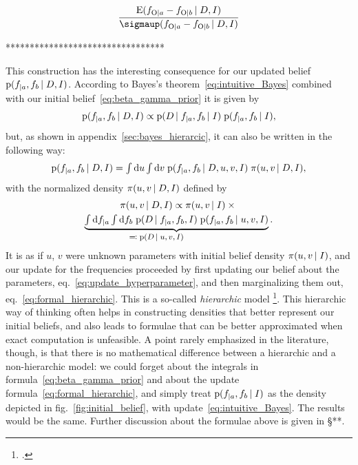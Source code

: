 \documentclass[\ifafour a4paper,12pt,\else a5paper,10pt,\fi%
onecolumn,oneside,article,%
british%
]{memoir}
\theoremstyle{remark}
\theoremstyle{innote}
\newcommand*{\citep}{\footcites}
\newcommand*{\di}{\mathrm{d}}%
\newcommand*{\defs}{\eqqcolon}
\newcommand*{\pf}{\mathrm{p}}%
\newcommand*{\E}{\mathrm{E}}
\renewcommand*{\|}[1][]{\nonscript\,#1\vert\nonscript\;\mathopen{}}
\newcommand*{\sect}{\S}%
\newcommand*{\eqn}{eq.}%
\newcommand*{\fig}{fig.}%
\newcommand*{\zerob}[1]{\makebox[0pt][l]{#1}}
\newcommand*{\tint}{\begingroup\textstyle\int\endgroup\nolimits}
\newcommand*{\std}{\sigmaup}
\newcommand*{\yD}{D}
\newcommand*{\yI}{I}
\newcommand*{\ya}{a}
\newcommand*{\yb}{b}
\newcommand*{\ysA}{\textrm{O}}%
\newcommand*{\dbeta}{\betaup}
\newcommand*{\dA}{\pi}
\newcommand*{\yua}{u}
\newcommand*{\yub}{v}
\begin{document}
\[
  \frac{  \E(f_{\ysA\|\ya} - f_{\ysA\|\yb} \| \yD, \yI)}{
    \std(f_{\ysA\|\ya} - f_{\ysA\|\yb} \| \yD, \yI)}
\]

*********************************

This construction has the interesting consequence for our updated belief
$\pf(f_{|\ya}, f_{\yb} \| \yD, \yI)$. According to Bayes's
theorem~\eqref{eq:intuitive_Bayes} combined with our initial
belief~\eqref{eq:beta_gamma_prior} it is given by
\begin{equation}
  \label{eq:straight_Bayes}
  \pf(f_{|\ya}, f_{\yb} \| \yD, \yI)
  \propto
  \pf(\yD \| f_{|\ya}, f_{\yb} \| \yI)\;
  \pf(f_{|\ya}, f_{\yb} \| \yI),
\end{equation}
but, as shown in appendix~\ref{sec:bayes_hierarcic}, it can also be written
in the following way:
\begin{equation}
  \label{eq:formal_hierarchic}
  \pf(f_{|\ya}, f_{\yb} \| \yD, \yI) =
  \tint\di\yua\tint\di\yub\;
  \pf(f_{|\ya}, f_{\yb}\| \yD,\yua,\yub,\yI)\;
  \dA(\yua,\yub \|\yD, \yI),
\end{equation}
with the normalized density $\dA(\yua,\yub \|\yD, \yI)$ defined by
\begin{multline}
  \label{eq:update_hyperparameter}
  \dA(\yua,\yub \|\yD, \yI) \propto   \dA(\yua,\yub \|\yI)
\times{}\\
\underbrace{\tint\di f_{|\ya}\tint\di f_{\yb}\;
  \pf(\yD \|f_{|\ya}, f_{\yb}, \yI)\;
 \pf(f_{|\ya}, f_{\yb} \|\yua,\yub, \yI)}_{\zerob{\footnotesize${}\defs\pf(\yD \|\yua,\yub,\yI)$}}.
\end{multline}
It is as if $\yua$, $\yub$ were unknown parameters with initial belief
density $\dA(\yua,\yub \|\yI)$, and our update for the frequencies proceeded by
first updating our belief about the parameters,
\eqn~\eqref{eq:update_hyperparameter}, and then marginalizing them out,
\eqn~\eqref{eq:formal_hierarchic}. This is a so-called \emph{hierarchic}
model \citep{good1980}. This hierarchic way of thinking often helps in
constructing densities that better represent our initial beliefs, and also
leads to formulae that can be better approximated when exact computation is
unfeasible. A point rarely emphasized in the literature, though, is that
there is no mathematical difference between a hierarchic and a
non-hierarchic model: we could forget about the integrals in
formula~\eqref{eq:beta_gamma_prior} and about the update
formula~\eqref{eq:formal_hierarchic}, and simply treat
$\pf(f_{|\ya}, f_{\yb} \| \yI)$ as the density depicted in
\fig~\ref{fig:initial_belief}, with update~\eqref{eq:intuitive_Bayes}. The
results would be the same. Further discussion about the formulae above is
given in \sect***.
\end{document}
